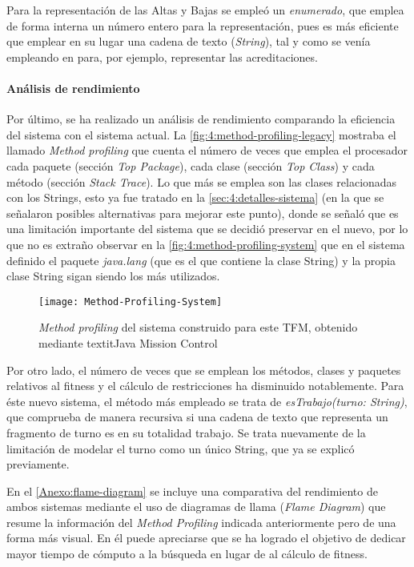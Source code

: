 Para la representación de las Altas y Bajas se empleó un \textit{enumerado}, que emplea de forma interna un número entero para la representación, pues es más eficiente que emplear en su lugar una cadena de texto (\textit{String}), tal y como se venía empleando en \legacy{} para, por ejemplo, representar las acreditaciones.

\paragraph{Análisis de rendimiento}
Por último, se ha realizado un análisis de rendimiento comparando la eficiencia del sistema \legacy{} con el sistema actual. La \autoref{fig:4:method-profiling-legacy} mostraba el llamado \textit{Method profiling} que cuenta el número de veces que emplea el procesador cada paquete (sección \textit{Top Package}), cada clase (sección \textit{Top Class}) y cada método (sección \textit{Stack Trace}). Lo que más se emplea son las clases relacionadas con los Strings, esto ya fue tratado en la \autoref{sec:4:detalles-sistema} (en la que se señalaron posibles alternativas para mejorar este punto), donde se señaló que es una limitación importante del sistema \legacy{} que se decidió preservar en el nuevo, por lo que no es extraño observar en la \autoref{fig:4:method-profiling-system} que en el sistema definido el paquete \textit{java.lang} (que es el que contiene la clase String) y la propia clase String sigan siendo los más utilizados.

\begin{figure}
	\centering
	\texttt{[image: Method-Profiling-System]}
	\caption{\textit{Method profiling} del sistema construido para este TFM, obtenido mediante textit{Java Mission Control}}
	\label{fig:4:method-profiling-system}
\end{figure}



Por otro lado, el número de veces que se emplean los métodos, clases y paquetes relativos al fitness y el cálculo de restricciones ha disminuido notablemente. Para éste nuevo sistema, el método más empleado se trata de \textit{esTrabajo(turno: String)}, que comprueba de manera recursiva si una cadena de texto que representa un fragmento de turno es en su totalidad trabajo. Se trata nuevamente de la limitación de modelar el turno como un único String, que ya se explicó previamente.

En el \autoref{Anexo:flame-diagram} se incluye una comparativa del rendimiento de ambos sistemas mediante el uso de diagramas de llama (\textit{Flame Diagram}) que resume la información del \textit{Method Profiling} indicada anteriormente pero de una forma más visual. En él puede apreciarse que se ha logrado el objetivo de dedicar mayor tiempo de cómputo a la búsqueda en lugar de al cálculo de fitness.


